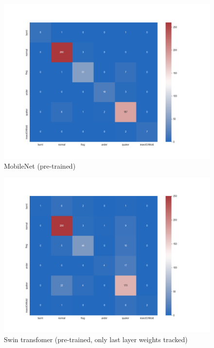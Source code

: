 \begin{figure}
    \centering
    \includegraphics[width=\textwidth]{figures/confusionMatrices/mobilenet-95acc}
    \caption{MobileNet (pre-trained)}
    \label{fig:mobileNetPt}
\end{figure}

\begin{figure}
    \centering
    \includegraphics[width=\textwidth]{figures/confusionMatrices/swin_b_85_acc_4_batch}
    \caption{Swin transfomer (pre-trained, only last layer weights tracked)}
    \label{fig:swin}
\end{figure}
